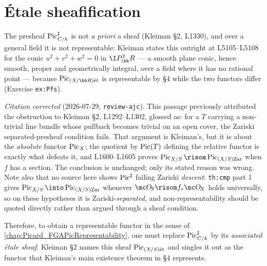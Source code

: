 \section{\'Etale sheafification}
\label{sec:relpic_etale_sheaf}

The presheaf \(\operatorname{Pic}^\sharp_{C/k}\) is not \emph{a priori} a sheaf (Kleiman
\S 2, L1330), and over a general field it is not representable: Kleiman states
this outright at L5105--L5108 for the conic \(u^2+v^2+w^2=0\) in
\(\I P^2_\bb R\) --- a smooth plane conic, hence smooth, proper and
geometrically integral, over a field where it has no rational point ---
because \(\Pic_{(X/\bb R)\et}\) is representable by \S 4 while the two
functors differ (Exercise \texttt{ex:Pfs}).

\emph{Citation corrected} (2026-07-29, \texttt{review-ajc}). This passage
previously attributed the obstruction to Kleiman \S 2, L1292--L1302, glossed as:
for a \(T\) carrying a non-trivial line bundle whose pullback becomes trivial on
an open cover, the Zariski separated-presheaf condition fails. That argument is
Kleiman's, but it is about the \emph{absolute} functor \(\operatorname{Pic}_X\); the quotient by
\(\operatorname{Pic}(T)\) defining the relative functor is exactly what defeats it, and
L1600--L1605 proves \(\Pic_{X/S} \risom \Pic_{(X/S)\zar}\) when \(f\) has a
section. The conclusion is unchanged; only its stated reason was wrong. Note
also that no source here shows \(\operatorname{Pic}^\sharp\) failing Zariski \emph{descent}:
\texttt{th:cmp} part 1 gives \(\Pic_{X/S}\into\Pic_{(X/S)\zar}\) whenever
\(\mc O_{\!S}\risom f_*\mc O_{\!X}\) holds universally, so on these hypotheses it
is Zariski-\emph{separated}, and non-representability should be quoted directly
rather than argued through a sheaf condition.

Therefore, to obtain a representable functor in the sense of
\cref{chap:Picard_FGAPicRepresentability}, one must replace
\(\operatorname{Pic}^\sharp_{C/k}\) by its \emph{associated \'etale sheaf}. Kleiman \S 2 names
this sheaf \(\operatorname{Pic}_{(X/S)\mathrm{\acute{e}t}}\) and singles it out as the functor that Kleiman's
main existence theorem in \S 4 represents.

